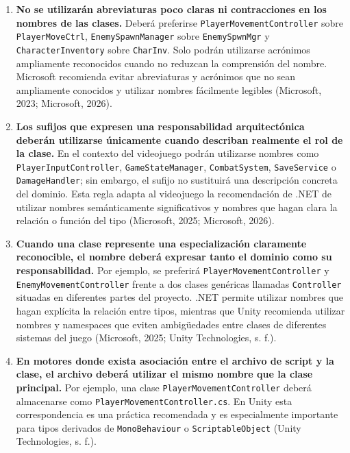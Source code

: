 \begin{enumerate}
  \item \textbf{No se utilizarán abreviaturas poco claras ni contracciones en los nombres de las clases.} Deberá preferirse \texttt{PlayerMovementController} sobre \texttt{PlayerMoveCtrl}, \texttt{EnemySpawnManager} sobre \texttt{EnemySpwnMgr} y \texttt{CharacterInventory} sobre \texttt{CharInv}. Solo podrán utilizarse acrónimos ampliamente reconocidos cuando no reduzcan la comprensión del nombre. Microsoft recomienda evitar abreviaturas y acrónimos que no sean ampliamente conocidos y utilizar nombres fácilmente legibles (Microsoft, 2023; Microsoft, 2026).

  \item \textbf{Los sufijos que expresen una responsabilidad arquitectónica deberán utilizarse únicamente cuando describan realmente el rol de la clase.} En el contexto del videojuego podrán utilizarse nombres como \texttt{PlayerInputController}, \texttt{GameStateManager}, \texttt{CombatSystem}, \texttt{SaveService} o \texttt{DamageHandler}; sin embargo, el sufijo no sustituirá una descripción concreta del dominio. Esta regla adapta al videojuego la recomendación de .NET de utilizar nombres semánticamente significativos y nombres que hagan clara la relación o función del tipo (Microsoft, 2025; Microsoft, 2026).

  \item \textbf{Cuando una clase represente una especialización claramente reconocible, el nombre deberá expresar tanto el dominio como su responsabilidad.} Por ejemplo, se preferirá \texttt{PlayerMovementController} y \texttt{EnemyMovementController} frente a dos clases genéricas llamadas \texttt{Controller} situadas en diferentes partes del proyecto. .NET permite utilizar nombres que hagan explícita la relación entre tipos, mientras que Unity recomienda utilizar nombres y namespaces que eviten ambigüedades entre clases de diferentes sistemas del juego (Microsoft, 2025; Unity Technologies, s. f.).

  \item \textbf{En motores donde exista asociación entre el archivo de script y la clase, el archivo deberá utilizar el mismo nombre que la clase principal.} Por ejemplo, una clase \texttt{PlayerMovementController} deberá almacenarse como \texttt{PlayerMovementController.cs}. En Unity esta correspondencia es una práctica recomendada y es especialmente importante para tipos derivados de \texttt{MonoBehaviour} o \texttt{ScriptableObject} (Unity Technologies, s. f.).
\end{enumerate}

